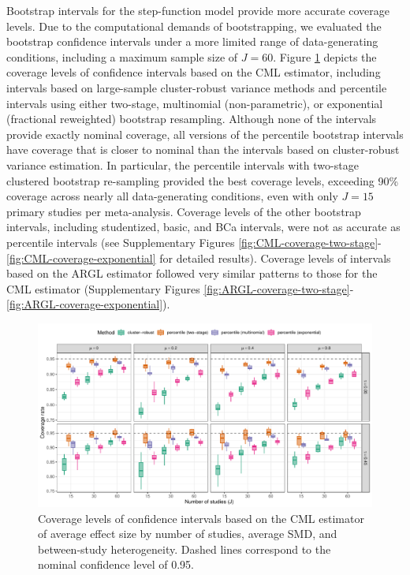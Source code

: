 \documentclass[
  american,
  man, donotrepeattitle,floatsintext]{apa7}
\begin{document}
Bootstrap intervals for the step-function model provide more accurate coverage levels.
Due to the computational demands of bootstrapping, we evaluated the bootstrap confidence intervals under a more limited range of data-generating conditions, including a maximum sample size of \(J = 60\).
Figure \ref{fig:CML-coverage} depicts the coverage levels of confidence intervals based on the CML estimator, including intervals based on large-sample cluster-robust variance methods and percentile intervals using either two-stage, multinomial (non-parametric), or exponential (fractional reweighted) bootstrap resampling.
Although none of the intervals provide exactly nominal coverage, all versions of the percentile bootstrap intervals have coverage that is closer to nominal than the intervals based on cluster-robust variance estimation.
In particular, the percentile intervals with two-stage clustered bootstrap re-sampling provided the best coverage levels, exceeding 90\% coverage across nearly all data-generating conditions, even with only \(J = 15\) primary studies per meta-analysis.
Coverage levels of the other bootstrap intervals, including studentized, basic, and BCa intervals, were not as accurate as percentile intervals (see Supplementary Figures \ref{fig:CML-coverage-two-stage}-\ref{fig:CML-coverage-exponential} for detailed results).
Coverage levels of intervals based on the ARGL estimator followed very similar patterns to those for the CML estimator (Supplementary Figures \ref{fig:ARGL-coverage-two-stage}-\ref{fig:ARGL-coverage-exponential}).

\begin{figure}
\includegraphics{step-function-selection-models-with-dependent-effects_files/figure-latex/CML-coverage-1} \caption{Coverage levels of confidence intervals based on the CML estimator of average effect size by number of studies, average SMD, and between-study heterogeneity. Dashed lines correspond to the nominal confidence level of 0.95.}\label{fig:CML-coverage}
\end{figure}
\end{document}
